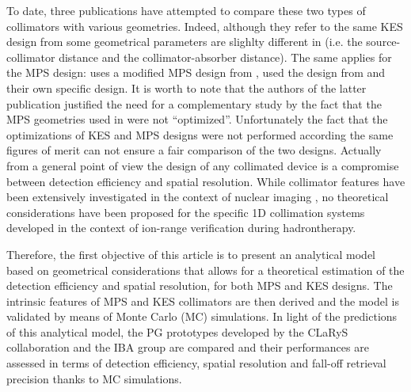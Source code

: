 \documentclass[a4paper,english,12pt]{article}
\begin{document}
To date, three publications \citep{Smeets2016, Lin2017, Park2017} have attempted to compare these two types of collimators with various geometries. Indeed, although they refer to the same KES design from \citep{Perali2014} some geometrical parameters are slighlty different in \citep{Lin2017, Park2017} (i.e. the source-collimator distance and the collimator-absorber distance). The same applies for the MPS design: \cite{Smeets2016} uses a modified MPS design from \cite{Pinto2014a}, \cite{Lin2017} used the design from \cite{Gueth2013} and \cite{Park2017} their own specific design. It is worth to note that the authors of the latter publication justified the need for a complementary study by the fact that the MPS geometries used in \cite{Smeets2016, Lin2017} were not \enquote{optimized}. 
Unfortunately the fact that the optimizations of KES and MPS designs were not performed according the same figures of merit can not ensure a fair comparison of the two designs. Actually from a general point of view the design of any collimated device is a compromise between detection efficiency and spatial resolution. While collimator features have been extensively investigated in the context of nuclear imaging \citep{Gunter2004}, no theoretical considerations have been proposed for the specific 1D collimation systems developed in the context of ion-range verification during hadrontherapy.

Therefore, the first objective of this article is to present an analytical model based on geometrical considerations that allows for a theoretical estimation of the detection efficiency and spatial resolution, for both MPS and KES designs. The intrinsic features of MPS and KES collimators are then derived and the model is validated by means of Monte Carlo (MC) simulations. In light of the predictions of this analytical model, the PG prototypes developed by the CLaRyS collaboration and the IBA group are compared and their performances are assessed in terms of detection efficiency, spatial resolution and fall-off retrieval precision thanks to MC simulations.

\end{document}
